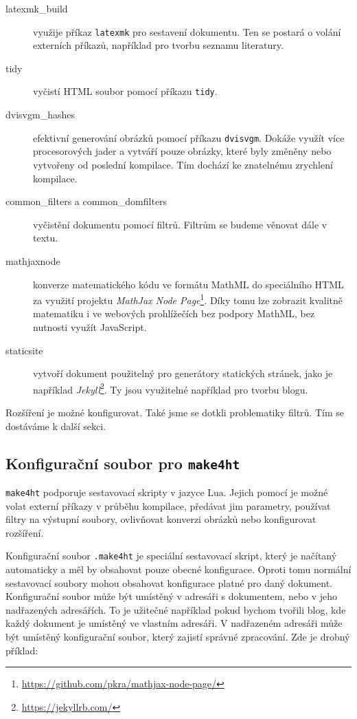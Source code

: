 \documentclass{csbulletin}
\newcommand\nazev[1]{\textit{#1}}
\newcommand\prikaz[1]{\texttt{#1}}
\begin{document}
\begin{description}
  \item[latexmk\_build] využije příkaz \prikaz{latexmk} pro sestavení
    dokumentu. Ten se postará o volání externích příkazů, například pro tvorbu
    seznamu literatury.
  \item[tidy] vyčistí HTML soubor pomocí příkazu \prikaz{tidy}.
  \item[dvisvgm\_hashes] efektivní generování obrázků pomocí příkazu
    \prikaz{dvisvgm}. Dokáže využít více procesorových jader a vytváří pouze
    obrázky, které byly změněny nebo vytvořeny od poslední kompilace. Tím
    dochází ke znatelnému zrychlení kompilace.
  \item[common\_filters a common\_domfilters] vyčistění dokumentu pomocí filtrů. Filtrům se budeme věnovat dále v textu.
  \item[mathjaxnode] konverze matematického kódu ve formátu MathML do
    speciálního HTML za využití projektu \nazev{MathJax Node
    Page}\footnote{\url{https://github.com/pkra/mathjax-node-page/}}. Díky tomu
    lze zobrazit kvalitně matematiku i ve webových prohlížečích bez podpory
    MathML, bez nutnosti využít JavaScript.
  \item[staticsite]  vytvoří dokument použitelný pro generátory statických
    stránek, jako je například
    \nazev{Jekyll}\footnote{\url{https://jekyllrb.com/}}. Ty jsou využitelné
    například pro tvorbu blogu.
\end{description}

Rozšíření je možné konfigurovat. Také jsme se dotkli problematiky filtrů. Tím se dostáváme k další sekci.

\subsection{Konfigurační soubor pro \prikaz{make4ht}}

\prikaz{make4ht} podporuje sestavovací skripty v jazyce Lua. Jejich pomocí je
možné volat externí příkazy v průběhu kompilace, předávat jim parametry,
používat filtry na výstupní soubory, ovlivňovat konverzi obrázků nebo
konfigurovat rozšíření.

Konfigurační soubor \texttt{.make4ht} je speciální sestavovací skript, který je
načítaný automaticky a měl by obsahovat pouze obecné konfigurace. Oproti tomu
normální sestavovací soubory mohou obsahovat konfigurace platné pro daný
dokument. Konfigurační soubor může být umístěný v adresáři s dokumentem, nebo v
jeho nadřazených adresářích. To je užitečné například pokud bychom tvořili
blog, kde každý dokument je umístěný ve vlastním adresáři. V nadřazeném
adresáři může být umístěný konfigurační soubor, který zajistí správné
zpracování. Zde je drobný příklad:
\end{document}

